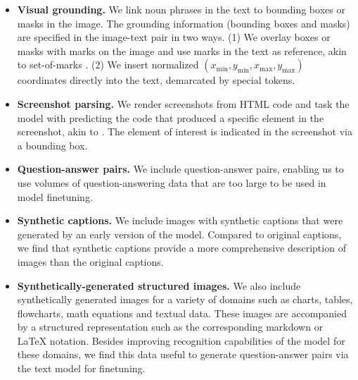 \begin{itemize}

\item \textbf{Visual grounding.} We link noun phrases in the text to bounding boxes or masks in the image. The grounding information (bounding boxes and masks) are specified in the image-text pair in two ways. (1) We overlay boxes or masks with marks on the image and use marks in the text as reference, akin to set-of-marks \citep{yang2023set}. (2) We insert normalized $(x_\textrm{min}, y_\textrm{min}, x_\textrm{max}, y_\textrm{max})$ coordinates directly into the text, demarcated by special tokens.

\item \textbf{Screenshot parsing.} We render screenshots from HTML code and task the model with predicting the code that produced a specific element in the screenshot, akin to \citet{Pix2Struct}. The element of interest is indicated in the screenshot via a bounding box.

\item \textbf{Question-answer pairs.} We include question-answer pairs, enabling us to use volumes of question-answering data that are too large to be used in model finetuning.

\item \textbf{Synthetic captions.} We include images with synthetic captions that were generated by an early version of the model. Compared to original captions, we find that synthetic captions provide a more comprehensive description of images than the original captions.

\item \textbf{Synthetically-generated structured images.} We also include synthetically generated images for a variety of domains such as charts, tables, flowcharts, math equations and textual data. These images are accompanied by a structured representation such as the corresponding markdown or LaTeX notation. Besides improving recognition capabilities of the model for these domains, we find this data useful to generate question-answer pairs via the text model for finetuning.
\end{itemize}

